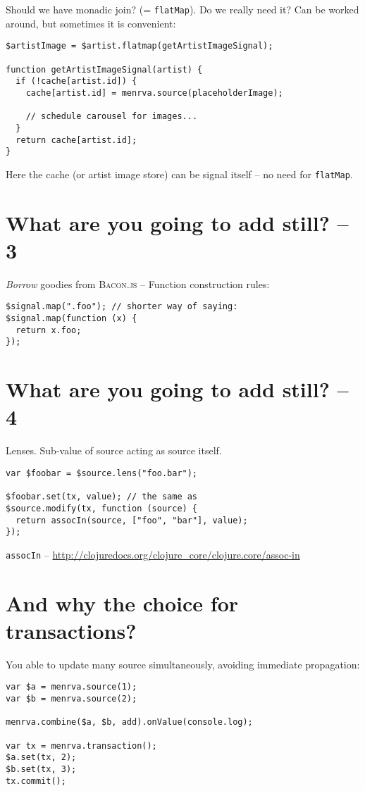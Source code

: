 \documentclass[10pt,fleqn]{article}
\theoremstyle{definition}
\theoremstyle{plain}
\begin{document}
Should we have monadic join? (= \texttt{flatMap}). Do we really need it? Can be worked around, but sometimes it is convenient:
{\small
\begin{verbatim}
$artistImage = $artist.flatmap(getArtistImageSignal);

function getArtistImageSignal(artist) {
  if (!cache[artist.id]) { 
    cache[artist.id] = menrva.source(placeholderImage);
    
    // schedule carousel for images...
  }
  return cache[artist.id];
}
\end{verbatim}
}
Here the cache (or artist image store) can be signal itself -- no need for \texttt{flatMap}.


\section*{What are you going to add still? -- 3}

\emph{Borrow} goodies from \textsc{Bacon.js} -- Function construction rules:
\begin{verbatim}
$signal.map(".foo"); // shorter way of saying:
$signal.map(function (x) {
  return x.foo;
});
\end{verbatim}

\newpage


\section*{What are you going to add still? -- 4}

Lenses. Sub-value of source acting as source itself.
\begin{verbatim}
var $foobar = $source.lens("foo.bar");

$foobar.set(tx, value); // the same as
$source.modify(tx, function (source) {
  return assocIn(source, ["foo", "bar"], value);
});
\end{verbatim}
\texttt{assocIn} -- \url{http://clojuredocs.org/clojure_core/clojure.core/assoc-in}

\newpage

\section*{And why the choice for transactions?}

You able to update many source simultaneously, avoiding immediate propagation:
\begin{verbatim}
var $a = menrva.source(1);
var $b = menrva.source(2);

menrva.combine($a, $b, add).onValue(console.log);

var tx = menrva.transaction();
$a.set(tx, 2);
$b.set(tx, 3);
tx.commit();
\end{verbatim}
\end{document}
